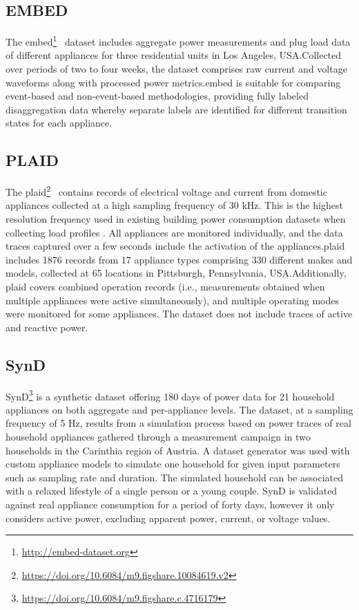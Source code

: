 \subsection{EMBED}

The \acrlong{embed}\footnote{\url{http://embed-dataset.org}}~\parencite{jazizadehEMBEDDatasetEnergy2018} dataset includes aggregate power measurements and plug load data of different appliances for three residential units in Los Angeles, USA.\@ Collected over periods of two to four weeks, the dataset comprises raw current and voltage waveforms along with processed power metrics.\@ \acrshort{embed} is suitable for comparing event-based and non-event-based methodologies, providing fully labeled disaggregation data whereby separate labels are identified for different transition states for each appliance.

\subsection{PLAID}

The \acrlong{plaid}\footnote{\url{https://doi.org/10.6084/m9.figshare.10084619.v2}}~\parencite{medicoVoltageCurrentMeasurement2020} contains records of electrical voltage and current from domestic appliances collected at a high sampling frequency of 30 kHz. This is the highest resolution frequency used in existing building power consumption datasets when collecting load profiles \parencite{himeurBuildingPowerConsumption2020}. All appliances are monitored individually, and the data traces captured over a few seconds include the activation of the appliances.\@ \acrshort{plaid} includes 1876 records from 17 appliance types comprising 330 different makes and models, collected at 65 locations in Pittsburgh, Pennsylvania, USA.\@ Additionally, \acrshort{plaid} covers combined operation records (i.e., measurements obtained when multiple appliances were active simultaneously), and multiple operating modes were monitored for some appliances. The dataset does not include traces of active and reactive power.

\subsection{SynD}

SynD\footnote{\url{https://doi.org/10.6084/m9.figshare.c.4716179}} \parencite{klemenjakSyntheticEnergyDataset2020} is a synthetic dataset offering 180 days of  power data for 21 household appliances on both aggregate and per-appliance levels. The dataset, at a sampling frequency of 5 Hz, results from a simulation process based on power traces of real household appliances gathered through a measurement campaign in two households in the Carinthia region of Austria. A dataset generator was used with custom appliance models to simulate one household for given input parameters such as sampling rate and duration. The simulated household can be associated with a relaxed lifestyle of a single person or a young couple. SynD is validated against real appliance consumption for a period of forty days, however it only considers active power, excluding apparent power, current, or voltage values.

